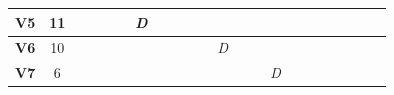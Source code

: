 \documentclass[pdflatex,sn-mathphys]{sn-jnl}%
\begin{document}
\begin{table}[tbh]
\begin{adjustbox}{width=\textwidth}
\begin{tabular}{|cc|ccccccc|ccccccc|ccccccc|}
\multicolumn{1}{|c|}{\textbf{V5}}                       & 11                               & \multicolumn{1}{c|}{}             & \multicolumn{1}{c|}{}             & \multicolumn{1}{c|}{}             & \multicolumn{1}{c|}{}             & \multicolumn{1}{c|}{\textit{D}}   & \multicolumn{2}{c|}{}                            & \multicolumn{7}{c|}{}                                                                                                                                                                                                                & \multicolumn{2}{c|}{}                                                 & \multicolumn{1}{c|}{}             & \multicolumn{1}{c|}{}             & \multicolumn{1}{c|}{}             & \multicolumn{1}{c|}{}             &              \\ \hline
\multicolumn{1}{|c|}{\textbf{V6}}                       & 10                               & \multicolumn{1}{c|}{}             & \multicolumn{1}{c|}{}             & \multicolumn{1}{c|}{}             & \multicolumn{1}{c|}{}             & \multicolumn{1}{c|}{}             & \multicolumn{1}{c|}{}             &              & \multicolumn{1}{c|}{}             & \multicolumn{1}{c|}{}             & \multicolumn{1}{c|}{\textit{D}}   & \multicolumn{4}{c|}{}                                                                                                    & \multicolumn{6}{c|}{}                                                                                                                                                                                                 &              \\ \hline
\multicolumn{1}{|c|}{\textbf{V7}}                       & 6                                & \multicolumn{1}{c|}{}             & \multicolumn{1}{c|}{}             & \multicolumn{1}{c|}{}             & \multicolumn{1}{c|}{}             & \multicolumn{1}{c|}{}             & \multicolumn{1}{c|}{}             &              & \multicolumn{1}{c|}{}             & \multicolumn{1}{c|}{}             & \multicolumn{1}{c|}{}             & \multicolumn{1}{c|}{}             & \multicolumn{1}{c|}{}             & \multicolumn{1}{c|}{\textit{D}}   &              & \multicolumn{5}{c|}{}                                                                                                                                                             & \multicolumn{1}{c|}{}             &              \\ \hline

\end{tabular}
\end{adjustbox}
\end{table}
\end{document}
